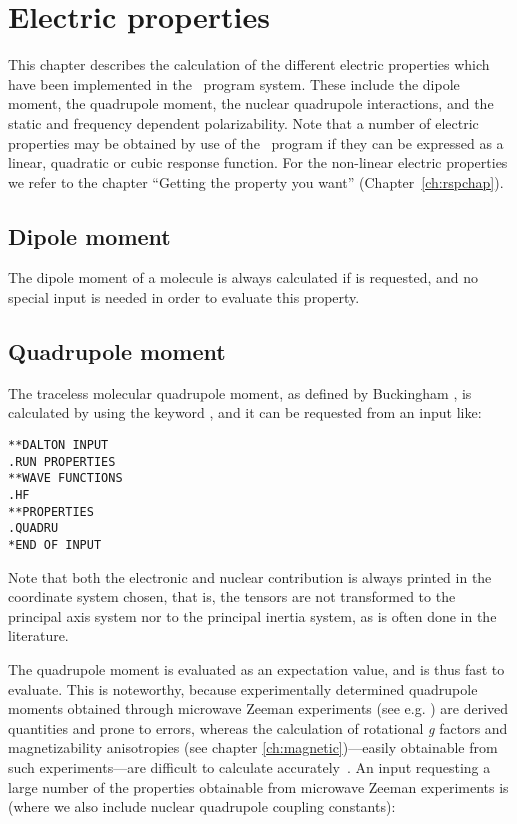 \chapter{Electric properties}\label{ch:electric}

This chapter describes the calculation of the different electric
properties which have been implemented in the \siraba\ program system.
These include the dipole moment, the quadrupole
moment, the nuclear quadrupole
interactions,  and the static and frequency dependent
polarizability. Note that a number of electric
properties may be
obtained by use of the \resp\ program if they can be expressed as a
linear, quadratic or cubic response function. For the non-linear
electric properties we refer to the chapter ``Getting the property you
want'' (Chapter~\ref{ch:rspchap}).

\section{Dipole moment}\label{sec:dipmom}

The dipole moment of a  molecule is always
calculated if  is
requested, and no special input is needed in order to evaluate this property.

\section{Quadrupole moment}\label{sec:quadmom}

The traceless molecular quadrupole moment, as
defined by Buckingham
\cite{adbacp12}, is calculated by using the keyword , and
it can be requested from an input like:

\begin{verbatim}
**DALTON INPUT
.RUN PROPERTIES
**WAVE FUNCTIONS
.HF
**PROPERTIES
.QUADRU
*END OF INPUT
\end{verbatim}

Note that both the electronic and nuclear contribution is always
printed in the coordinate system chosen, that is, the tensors are not
transformed to the principal axis system nor to the principal inertia
system, as is often done in the literature.

The quadrupole moment is evaluated as an expectation value, and is
thus fast to evaluate. This is noteworthy, because experimentally
determined quadrupole moments obtained through microwave Zeeman experiments
(see e.g.  \cite{whmklwhfjcp48,jsdhszna46}) are derived
quantities and prone to errors,
whereas the calculation of rotational {\em g} factors and magnetizability
anisotropies (see chapter
\ref{ch:magnetic})---easily obtainable from such
experiments---are difficult to calculate accurately~\cite{krthcpl264}. An input
requesting a large number of the properties obtainable from microwave
Zeeman experiments is (where we also include nuclear quadrupole
coupling constants):

